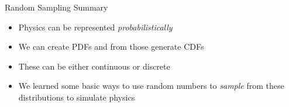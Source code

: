 \documentclass[xcolor=x11names,compress]{beamer}
\renewcommand{\(}{\begin{columns}}
\renewcommand{\)}{\end{columns}}
\newcommand{\<}[1]{\begin{column}{#1}}
\renewcommand{\>}{\end{column}}
\begin{document}
\begin{frame}{Random Sampling Summary}

    \begin{itemize}
    \item Physics can be represented \textit{probabilistically}

\vspace*{.5em}
    \item We can create PDFs and from those generate CDFs

\vspace*{.5em}
    \item These can be either continuous or discrete

\vspace*{.5em}
    \item We learned some basic ways to use random numbers to \textit{sample} from these distributions to \alert{simulate physics}
    \end{itemize}
    
\end{frame}
\end{document}
